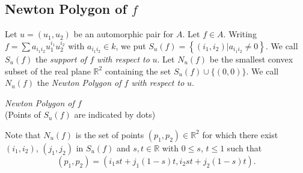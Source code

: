 \subsection{Newton Polygon of $f$}\label{part2:chap6:sec19:ss19.1}  

Let $u= (u_1, u_2)$ be an automorphic pair for $A$. Let $f \in
A$. Writing $f= \sum a_{i_1i_2} u_1^{i_1} u_2^{i_2}$ with $a_{i_1 i_2}
\in k$, we put $S_u (f) = \left\{ (i_1, i_2) \Big| a_{i_1 i_2} \neq 0
\right\}$. We call $S_u(f)$ the {\em support of $f$ with respect to}
$u$. Let $N_u (f)$ be the smallest convex subset of the real plane
$\mathbb{R}^2$ containing the set $S_u (f) \cup \{ (0, 0)\}$. We call
  $N_u(f)$ the {\em Newton Polygon of $f$ with respect to} $u$.
\begin{figure}[H]
\end{figure}
\begin{center}
  {\em Newton Polygon of $f$}\\
  (Points of $S_u(f)$ are indicated by dots)
\end{center}

Note that $N_u(f)$ is the set of points $(p_1, p_2) \in \mathbb{R}^2$
for which there exist $(i_1, i_2)$, $(j_1, j_2)$ in $S_u (f)$ and $s,
t \in \mathbb{R}$ with $0 \leq s$, $t \leq 1$ such that 
$$
(p_1 , p_2)= (i_1 st + j_1 (1-s)t, i_2 st + j_2(1-s)t).
$$

